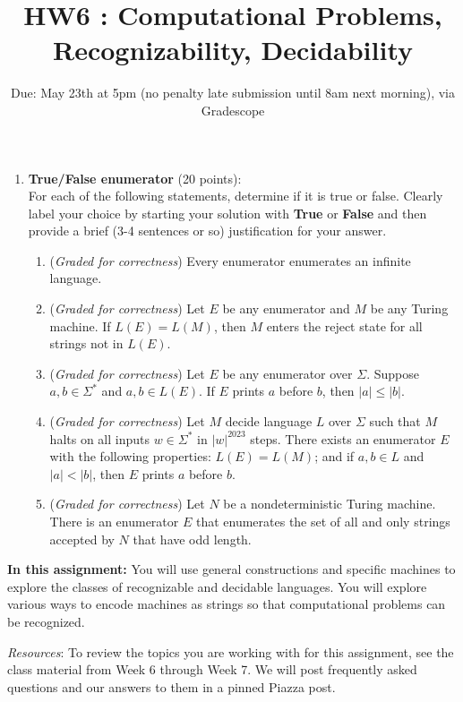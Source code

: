 \documentclass[12pt, oneside]{article}
\newcommand{\gradeCorrect}{({\it Graded for correctness}) }
\begin{document}
\begin{enumerate}
\item \textbf{True/False enumerator} (20 points): \\
For each of the following statements, determine if it is true or false. 
Clearly label your choice 
by starting your solution with {\bf True} or {\bf False} and then
provide a brief (3-4 sentences or so) justification for your answer.
\begin{enumerate}
\item\gradeCorrect Every enumerator enumerates an infinite language.
\item\gradeCorrect Let $E$ be any enumerator and $M$ be any Turing machine.
If $L(E) = L(M)$, then $M$ enters the reject state for all strings not in $L(E)$.
\item\gradeCorrect Let $E$ be any enumerator over $\Sigma$.
Suppose $a, b \in \Sigma^*$ and $a, b \in L(E)$.
If $E$ prints $a$ before $b$, then $|a| \le |b|$.
\item\gradeCorrect Let $M$ decide language $L$ over $\Sigma$
such that $M$ halts on all inputs $w \in \Sigma^*$ in $|w|^{2023}$ steps. 
There exists an enumerator $E$ with the following properties: $L(E) = L(M)$; 
and if $a, b \in L$ and $|a| < |b|$, then $E$ prints $a$ before $b$.
\item\gradeCorrect Let $N$ be a nondeterministic Turing machine. 
There is an enumerator $E$ that enumerates the set of all and only 
strings accepted by $N$ that have odd length.

\end{enumerate}

\end{enumerate}

\newpage

\title{HW6 : Computational Problems, Recognizability, Decidability}
\date{Due: May 23th at 5pm (no penalty late submission until 8am next morning), via Gradescope}


\maketitle
\thispagestyle{fancy}

\textbf{In this assignment:} You will use general constructions and specific machines 
to explore the classes of recognizable and decidable languages. You will explore various 
ways to encode machines as strings so that computational problems can be recognized.

\textit{Resources}:  To review the topics you are working with for this assignment, 
see the class material from Week 6 through Week 7. We will post frequently asked questions 
and our answers to them in a pinned Piazza post.
\end{document}
